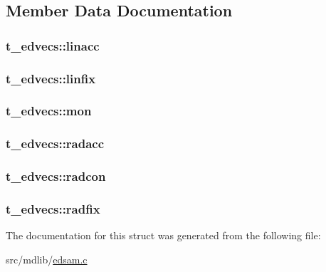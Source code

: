 \subsection{\-Member \-Data \-Documentation}
\hypertarget{structt__edvecs_a4cf53dd2c3e4911cacdbaaf098755199}{
\subsubsection[{linacc}]{ {\bf t\-\_\-edvecs\-::linacc}}}\label{structt__edvecs_a4cf53dd2c3e4911cacdbaaf098755199}
\hypertarget{structt__edvecs_a801ce367f7f84a6e7817fe3977806ea4}{
\subsubsection[{linfix}]{ {\bf t\-\_\-edvecs\-::linfix}}}\label{structt__edvecs_a801ce367f7f84a6e7817fe3977806ea4}
\hypertarget{structt__edvecs_ac42e8b859abc51dd429d3edb7f71ffe9}{
\subsubsection[{mon}]{ {\bf t\-\_\-edvecs\-::mon}}}\label{structt__edvecs_ac42e8b859abc51dd429d3edb7f71ffe9}
\hypertarget{structt__edvecs_ac76fac11480df899ec55dece55a4b1f3}{
\subsubsection[{radacc}]{ {\bf t\-\_\-edvecs\-::radacc}}}\label{structt__edvecs_ac76fac11480df899ec55dece55a4b1f3}
\hypertarget{structt__edvecs_a7d11ab497da4ead41461976c89743f96}{
\subsubsection[{radcon}]{ {\bf t\-\_\-edvecs\-::radcon}}}\label{structt__edvecs_a7d11ab497da4ead41461976c89743f96}
\hypertarget{structt__edvecs_a42b3688bc4b13975b1a0850cbb3ef7a7}{
\subsubsection[{radfix}]{ {\bf t\-\_\-edvecs\-::radfix}}}\label{structt__edvecs_a42b3688bc4b13975b1a0850cbb3ef7a7}


\-The documentation for this struct was generated from the following file\-:\begin{DoxyCompactItemize}
\item 
src/mdlib/\hyperlink{edsam_8c}{edsam.\-c}\end{DoxyCompactItemize}
